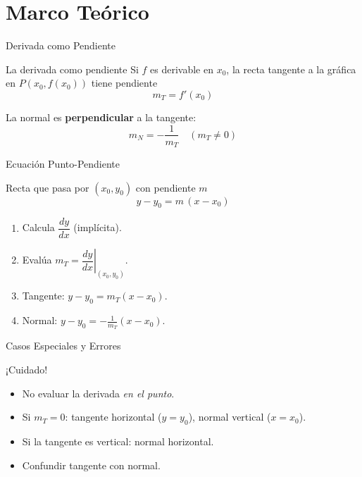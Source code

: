 \documentclass[aspectratio=169]{beamer}
\begin{document}
\begin{frame}[plain]
  \titlepage
\end{frame}

\section{Marco Teórico}

\begin{frame}{Derivada como Pendiente}
  \begin{block}{La derivada como pendiente}
    Si $f$ es derivable en $x_0$, la recta tangente a la gráfica en $P(x_0, f(x_0))$ tiene pendiente
    \[
      m_T = f'(x_0)
    \]
  \end{block}
  \vspace{6pt}
  \begin{mwextra}
    La normal es \textbf{perpendicular} a la tangente:
    \[
      m_N = -\frac{1}{m_T} \quad (m_T \neq 0)
    \]
  \end{mwextra}
\end{frame}

\begin{frame}{Ecuación Punto-Pendiente}
  \begin{block}{Recta que pasa por $(x_0, y_0)$ con pendiente $m$}
    \[
      y - y_0 = m\,(x - x_0)
    \]
  \end{block}
  \vspace{6pt}
  \begin{mwpasos}[Pasos para una curva implícita $F(x,y)=0$]
    \begin{enumerate}
      \item Calcula $\dfrac{dy}{dx}$ (implícita).
      \item Evalúa $m_T = \left.\dfrac{dy}{dx}\right|_{(x_0,y_0)}$.
      \item Tangente: $y - y_0 = m_T(x-x_0)$.
      \item Normal: $y - y_0 = -\frac{1}{m_T}(x-x_0)$.
    \end{enumerate}
  \end{mwpasos}
\end{frame}

\begin{frame}{Casos Especiales y Errores}
  \begin{alertblock}{¡Cuidado!}
    \begin{itemize}
      \item No evaluar la derivada \emph{en el punto}.
      \item Si $m_T = 0$: tangente horizontal ($y = y_0$), normal vertical ($x = x_0$).
      \item Si la tangente es vertical: normal horizontal.
      \item Confundir tangente con normal.
    \end{itemize}
  \end{alertblock}
\end{frame}
\end{document}

